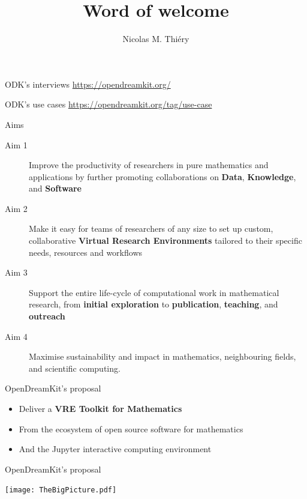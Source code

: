\documentclass{beamer}
\author{Nicolas M. Thiéry}
\title{Word of welcome}
\begin{document}
\begin{frame}
  \titlepage
\end{frame}

\begin{frame}{ODK's interviews}
  \url{https://opendreamkit.org/}
\end{frame}

\begin{frame}{ODK's use cases}
  \url{https://opendreamkit.org/tag/use-case}
\end{frame}

\begin{frame}{Aims}
  \begin{description}
  \item[Aim 1] Improve the productivity of researchers in pure mathematics and
    applications by further promoting collaborations on \textbf{Data},
    \textbf{Knowledge}, and \textbf{Software}
  \item[Aim 2] Make it easy for teams of researchers of any size to set up
    custom, collaborative \textbf{Virtual Research Environments}
    tailored to their specific needs, resources and workflows
  \item[Aim 3] Support the entire life-cycle of computational work in
    mathematical research, from \textbf{initial exploration} to
    \textbf{publication}, \textbf{teaching}, and \textbf{outreach}
  \item[Aim 4]  Maximise sustainability and impact in mathematics,
    neighbouring fields, and scientific computing.
  \end{description}
\end{frame}


\begin{frame}{OpenDreamKit's proposal}\label{our-proposal}
  \begin{itemize}
  \item Deliver a \textbf{VRE Toolkit for Mathematics}
  \item From the ecosystem of open source software for mathematics
  \item And the Jupyter interactive computing environment
  \end{itemize}
\end{frame}

\begin{frame}{OpenDreamKit's proposal}\label{our-proposal}
  \centerline{\texttt{[image: TheBigPicture.pdf]}}
\end{frame}
\end{document}
